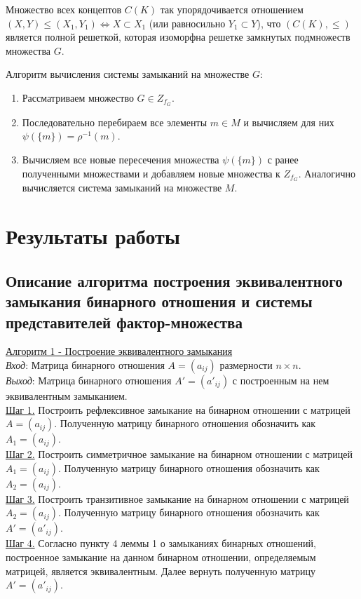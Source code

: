 \documentclass[bachelor, och, labwork]{shiza}
\begin{document}
        Множество всех концептов $C(K)$ так упорядочивается отношением \\ $(X, Y) \leq (X_1, Y_1) \Leftrightarrow X \subset X_1$ (или равносильно $Y_1 \subset Y$), что $(C(K), \leq)$ является полной решеткой, которая изоморфна решетке замкнутых подмножеств множества $G$.

        Алгоритм вычисления системы замыканий на множестве $G$:
        \begin{enumerate}
            \item Рассматриваем множество $G \in Z_{f_G}$.
            \item Последовательно перебираем все элементы $m \in M$ и вычисляем для них $\psi(\{m\}) = \rho^{-1}(m)$.
            \item Вычисляем все новые пересечения множества $\psi(\{m\})$ с ранее полученными множествами и добавляем новые множества к $Z_{f_G}$. Аналогично вычисляется система замыканий на множестве $M$.
        \end{enumerate}

\section{Результаты работы}
    \subsection{Описание алгоритма построения эквивалентного замыкания бинарного отношения и системы представителей
    фактор-множества}

        \underline{Алгоритм 1 - Построение эквивалентного замыкания}\\
            \textit{Вход}: Матрица бинарного отношения $A = (a_{ij})$ размерности $n \times n$.\\
            \textit{Выход}: Матрица бинарного отношения $A' = (a'_{ij})$ с построенным на нем эквивалентным
            замыканием.\\
            \underline{Шаг 1.} Построить рефлексивное замыкание на бинарном отношении с матрицей $A = (a_{ij})$.
            Полученную матрицу бинарного отношения обозначить как $A_1 = (a_{ij})$.\\
            \underline{Шаг 2.} Построить симметричное замыкание на бинарном отношении с матрицей $A_1 = (a_{ij})$.
            Полученную матрицу бинарного отношения обозначить как $A_2 = (a_{ij})$.\\
            \underline{Шаг 3.} Построить транзитивное замыкание на бинарном отношении с матрицей $A_2 = (a_{ij})$.
            Полученную матрицу бинарного отношения обозначить как $A' = (a'_{ij})$.\\
            \underline{Шаг 4.} Согласно пункту 4 леммы 1 о замыканиях бинарных отношений, построенное замыкание на
            данном бинарном отношении, определяемым матрицей, является эквивалентным. Далее вернуть полученную матрицу
            $A' = (a'_{ij})$.\\
            
\end{document}
